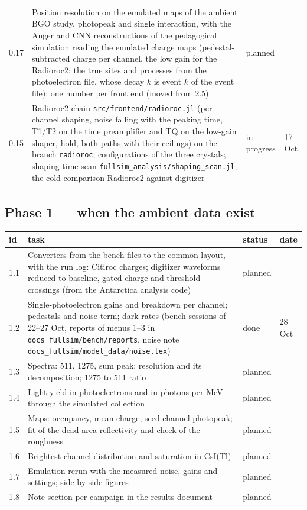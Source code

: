 \documentclass[11pt]{article}
\newcommand{\code}[1]{\texttt{#1}}
\newcommand{\csitl}{CsI(Tl)\xspace}
\newcommand{\planned}{planned}
\newcommand{\doing}{in progress}
\newcommand{\done}{done}
\begin{document}
\begin{longtable}{p{} p{} p{} p{}}
0.17 & Position resolution on the emulated maps of the ambient BGO study, photopeak and single interaction, with the Anger and CNN reconstructions of the pedagogical simulation reading the emulated charge maps (pedestal-subtracted charge per channel, the low gain for the Radioroc2; the true sites and processes from the photoelectron file, whose decay $k$ is event $k$ of the event file); one number per front end (moved from 2.5) & \planned & \\
0.15 & Radioroc2 chain \code{src/frontend/radioroc.jl} (per-channel shaping, noise falling with the peaking time, T1/T2 on the time preamplifier and TQ on the low-gain shaper, hold, both paths with their ceilings) on the branch \code{radioroc}; configurations of the three crystals; shaping-time scan \code{fullsim\_analysis/shaping\_scan.jl}; the cold comparison Radioroc2 against digitizer & \doing & 17 Oct \\
\bottomrule
\end{longtable}

\subsection*{Phase 1 --- when the ambient data exist}

\begin{longtable}{p{} p{} p{} p{}}
\toprule
id & task & status & date \\
\midrule
\endhead
1.1 & Converters from the bench files to the common layout, with the run log: Citiroc charges; digitizer waveforms reduced to baseline, gated charge and threshold crossings (from the Antarctica analysis code) & \planned & \\
1.2 & Single-photoelectron gains and breakdown per channel; pedestals and noise term; dark rates (bench sessions of 22--27 Oct, reports of menus 1--3 in \code{docs\_fullsim/bench/reports}, noise note \code{docs\_fullsim/model\_data/noise.tex}) & \done & 28 Oct \\
1.3 & Spectra: 511, 1275, sum peak; resolution and its decomposition; 1275 to 511 ratio & \planned & \\
1.4 & Light yield in photoelectrons and in photons per MeV through the simulated collection & \planned & \\
1.5 & Maps: occupancy, mean charge, seed-channel photopeak; fit of the dead-area reflectivity and check of the roughness & \planned & \\
1.6 & Brightest-channel distribution and saturation in \csitl & \planned & \\
1.7 & Emulation rerun with the measured noise, gains and settings; side-by-side figures & \planned & \\
1.8 & Note section per campaign in the results document & \planned & \\
\bottomrule
\end{longtable}
\end{document}
